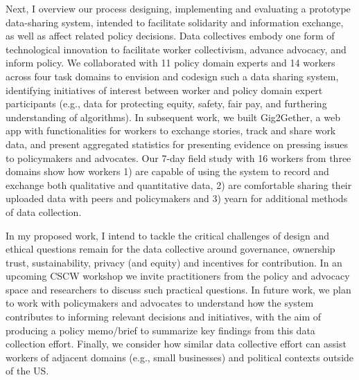 Next, I overview our process designing, implementing and evaluating a prototype data-sharing system, intended to facilitate solidarity and information exchange, as well as affect related policy decisions. Data collectives embody one form of technological innovation to facilitate worker collectivism, advance advocacy, and inform policy. We collaborated with 11 policy domain experts and 14 workers across four task domains to envision and codesign such a data sharing system, identifying initiatives of interest between worker and policy domain expert participants (e.g., data for protecting equity, safety, fair pay, and furthering understanding of algorithms). In subsequent work, we built Gig2Gether, a web app with functionalities for workers to exchange stories, track and share work data, and present aggregated statistics for presenting evidence on pressing issues to policymakers and advocates. Our 7-day field study with 16 workers from three domains show how workers 1) are capable of using the system to record and exchange both qualitative and quantitative data, 2) are comfortable sharing their uploaded data with peers and policymakers and 3) yearn for additional methods of data collection.

In my proposed work, I intend to tackle the critical challenges of design and ethical questions remain for the data collective around governance, ownership trust,
sustainability, privacy (and equity) and incentives for contribution. In an upcoming CSCW workshop we invite
practitioners from the policy and advocacy space and researchers to discuss such practical questions. In future
work, we plan to work with policymakers and advocates to understand how the system contributes to
informing relevant decisions and initiatives, with the aim of producing a policy memo/brief to summarize key
findings from this data collection effort. Finally, we consider how similar data collective effort can assist
workers of adjacent domains (e.g., small businesses) and political contexts outside of the US.
\vfill

\endgroup			

\vfill